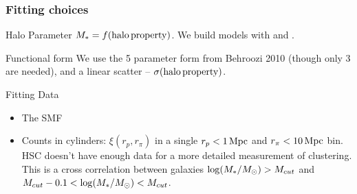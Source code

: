 \documentclass[t]{beamer}
\begin{document}
\begin{frame}
    \frametitle{Fitting choices}

    \begin{block}{Halo Parameter}
        $M_{\ast}{} = f({\rm halo\, property})$. We build models with \vmp{} and \MhaloPeak{}.
    \end{block}

    \begin{block}{Functional form}
        We use the 5 parameter form from Behroozi 2010 (though only 3 are needed), and a linear scatter -- $\sigma({\rm halo\, property})$.
    \end{block}

    \begin{block}{Fitting Data}
        \begin{itemize}
            \item The SMF
            \item Counts in cylinders: $\xi(r_p, r_{\pi})$ in a single $r_p < 1\,{\rm Mpc}$ and $r_{\pi} < 10\,{\rm Mpc}$ bin. HSC doesn't have enough data for a more detailed measurement of clustering. This is a cross correlation between galaxies ${\rm log}{}(M_{\ast}{} / \mbox{$M_{\odot}$}{}) > M_{cut}$ and $M_{cut} - 0.1 < {\rm log}{}(M_{\ast}{} / \mbox{$M_{\odot}$}{}) < M_{cut}$.
        \end{itemize}
    \end{block}

\end{frame}
\end{document}
